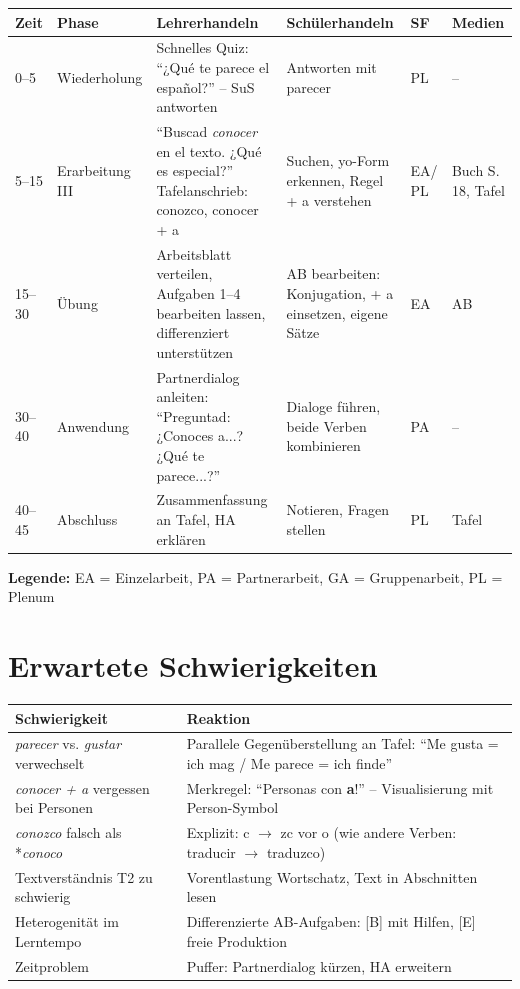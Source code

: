 \documentclass[11pt,a4paper]{article}
\begin{document}
\begin{longtable}{|p{0.8cm}|p{1.3cm}|p{4.5cm}|p{3.5cm}|p{1cm}|p{1.5cm}|}
\hline
\textbf{Zeit} & \textbf{Phase} & \textbf{Lehrerhandeln} & \textbf{Schülerhandeln} & \textbf{SF} & \textbf{Medien} \\
\hline
\endhead

0--5 & Wieder\-holung & Schnelles Quiz: ``¿Qué te parece el español?'' -- SuS antworten & Antworten mit parecer & PL & -- \\
\hline

5--15 & Erar\-bei\-tung III & ``Buscad \textit{conocer} en el texto. ¿Qué es especial?'' Tafelanschrieb: conozco, conocer + a & Suchen, yo-Form erkennen, Regel + a verstehen & EA/ PL & Buch S. 18, Tafel \\
\hline

15--30 & Übung & Arbeitsblatt verteilen, Aufgaben 1--4 bearbeiten lassen, differenziert unterstützen & AB bearbeiten: Konjugation, + a einsetzen, eigene Sätze & EA & AB \\
\hline

30--40 & Anwen\-dung & Partnerdialog anleiten: ``Preguntad: ¿Conoces a...? ¿Qué te parece...?'' & Dialoge führen, beide Verben kombinieren & PA & -- \\
\hline

40--45 & Ab\-schluss & Zusammenfassung an Tafel, HA erklären & Notieren, Fragen stellen & PL & Tafel \\
\hline
\end{longtable}

\textbf{Legende:} EA = Einzelarbeit, PA = Partnerarbeit, GA = Gruppenarbeit, PL = Plenum

\section{Erwartete Schwierigkeiten}

\begin{tabular}{|p{4.5cm}|p{8cm}|}
\hline
\textbf{Schwierigkeit} & \textbf{Reaktion} \\
\hline
\textit{parecer} vs. \textit{gustar} verwechselt & Parallele Gegenüberstellung an Tafel: ``Me gusta = ich mag / Me parece = ich finde'' \\
\hline
\textit{conocer + a} vergessen bei Personen & Merkregel: ``Personas con \textbf{a}!'' -- Visualisierung mit Person-Symbol \\
\hline
\textit{conozco} falsch als *\textit{conoco} & Explizit: c $\rightarrow$ zc vor o (wie andere Verben: traducir $\rightarrow$ traduzco) \\
\hline
Textverständnis T2 zu schwierig & Vorentlastung Wortschatz, Text in Abschnitten lesen \\
\hline
Heterogenität im Lerntempo & Differenzierte AB-Aufgaben: [B] mit Hilfen, [E] freie Produktion \\
\hline
Zeitproblem & Puffer: Partnerdialog kürzen, HA erweitern \\
\hline
\end{tabular}
\end{document}

